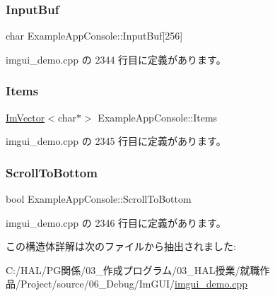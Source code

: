 \subsubsection{\texorpdfstring{Input\+Buf}{InputBuf}}
{\footnotesize\ttfamily char Example\+App\+Console\+::\+Input\+Buf\mbox{[}256\mbox{]}}



 imgui\+\_\+demo.\+cpp の 2344 行目に定義があります。

\mbox{\label{struct_example_app_console_acfde7d45fb733ac72d5d500168557b36}} 
\subsubsection{\texorpdfstring{Items}{Items}}
{\footnotesize\ttfamily \mbox{\hyperlink{class_im_vector}{Im\+Vector}}$<$char$\ast$$>$ Example\+App\+Console\+::\+Items}



 imgui\+\_\+demo.\+cpp の 2345 行目に定義があります。

\mbox{\label{struct_example_app_console_a69b1406795fd71a3757761b0767ea1c5}} 
\subsubsection{\texorpdfstring{Scroll\+To\+Bottom}{ScrollToBottom}}
{\footnotesize\ttfamily bool Example\+App\+Console\+::\+Scroll\+To\+Bottom}



 imgui\+\_\+demo.\+cpp の 2346 行目に定義があります。



この構造体詳解は次のファイルから抽出されました\+:\begin{DoxyCompactItemize}
\item 
C\+:/\+H\+A\+L/\+P\+G関係/03\+\_\+作成プログラム/03\+\_\+\+H\+A\+L授業/就職作品/\+Project/source/06\+\_\+\+Debug/\+Im\+G\+U\+I/\mbox{\hyperlink{imgui__demo_8cpp}{imgui\+\_\+demo.\+cpp}}\end{DoxyCompactItemize}
